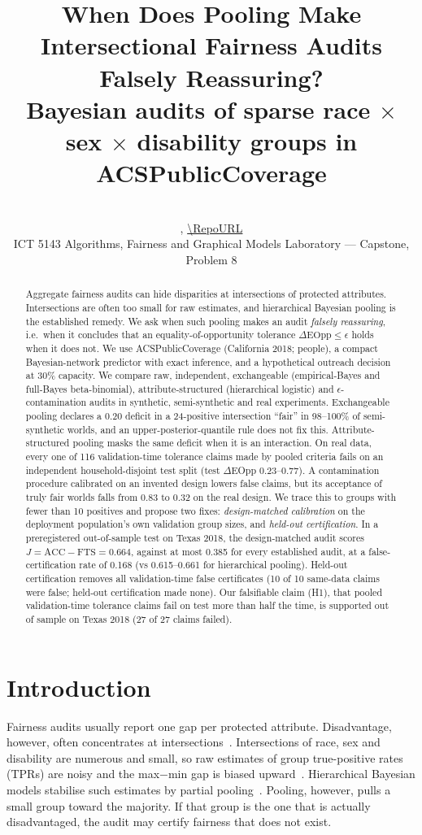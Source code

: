 \documentclass[11pt]{article}
\title{When Does Pooling Make Intersectional Fairness Audits Falsely Reassuring?\\[3pt]
\large Bayesian audits of sparse race $\times$ sex $\times$ disability groups in ACSPublicCoverage}
\author{\Authors\\ \small \texttt{\EmailA}, \texttt{\EmailB} \quad \url{\RepoURL}\\ \small ICT 5143 Algorithms, Fairness and Graphical Models Laboratory --- Capstone, Problem 8}
\date{\nbDate}
\begin{document}
\maketitle

\begin{abstract}
Aggregate fairness audits can hide disparities at intersections of protected attributes. Intersections are often too
small for raw estimates, and hierarchical Bayesian pooling is the established remedy. We ask when such pooling makes an
audit \emph{falsely reassuring}, i.e.\ when it concludes that an equality-of-opportunity tolerance
$\Delta\text{EOpp}\le\epsilon$ holds when it does not. We use ACSPublicCoverage (California 2018; \Nall{} people), a
compact Bayesian-network predictor with exact inference, and a hypothetical outreach decision at 30\% capacity. We
compare raw, independent, exchangeable (empirical-Bayes and full-Bayes beta-binomial), attribute-structured (hierarchical
logistic) and $\epsilon$-contamination audits in synthetic, semi-synthetic and real experiments. Exchangeable pooling
declares a 0.20 deficit in a 24-positive intersection ``fair'' in 98--100\% of semi-synthetic worlds, and an
upper-posterior-quantile rule does not fix this. Attribute-structured pooling masks the same deficit when it is an
interaction. On real data, every one of 116 validation-time tolerance claims made by pooled criteria fails on an
independent household-disjoint test split (test $\Delta$EOpp 0.23--0.77). A contamination procedure calibrated on an invented design
lowers false claims, but its acceptance of truly fair worlds falls from 0.83 to 0.32 on the real design. We trace this to
groups with fewer than 10 positives and propose two fixes: \emph{design-matched calibration} on the deployment
population's own validation group sizes, and \emph{held-out certification}. In a preregistered out-of-sample test on
Texas 2018, the design-matched audit scores $J=\text{ACC}-\text{FTS}=0.664$, against at most 0.385 for every established
audit, at a false-certification rate of 0.168 (vs 0.615--0.661 for hierarchical pooling). Held-out certification removes
all validation-time false certificates (10 of 10 same-data claims were false; held-out certification made none). Our falsifiable claim (H1), that pooled validation-time tolerance claims fail on test more than half the time, is supported out of sample on Texas 2018 (27 of 27 claims failed).
\end{abstract}

\section{Introduction}
Fairness audits usually report one gap per protected attribute. Disadvantage, however, often concentrates at
intersections~\cite{kearns2018,wang2022}. Intersections of race, sex and disability are numerous and small, so raw
estimates of group true-positive rates (TPRs) are noisy and the max$-$min gap is biased upward~\cite{lum2022}.
Hierarchical Bayesian models stabilise such estimates by partial pooling~\cite{foulds2020bayes,ji2020,herlihy2024}.
Pooling, however, pulls a small group toward the majority. If that group is the one that is actually disadvantaged, the
audit may certify fairness that does not exist.
\end{document}

